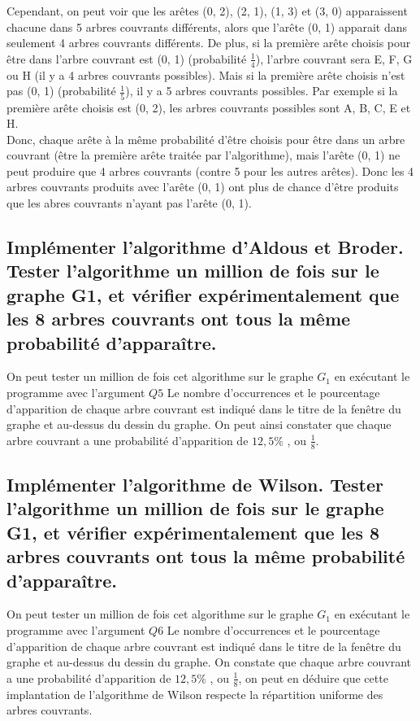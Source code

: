 \documentclass[a4paper,11pt]{article}
\begin{document}
            Cependant, on peut voir que les arêtes (0, 2), (2, 1), (1, 3) et (3, 0) apparaissent chacune dans 5 arbres couvrants différents,
            alors que l'arête (0, 1) apparait dans seulement 4 arbres couvrants différents.
            De plus, si la première arête choisis pour être dans l'arbre couvrant est (0, 1) (probabilité $\frac{1}{4}$),
            l'arbre couvrant sera E, F, G ou H (il y a 4 arbres couvrants possibles).
            Mais si la première arête choisis n'est pas (0, 1) (probabilité $\frac{1}{5}$),
            il y a 5 arbres couvrants possibles.
            Par exemple si la première arête choisis est (0, 2), les arbres couvrants possibles sont A, B, C, E et H.\\

            Donc, chaque arête à la même probabilité d'être choisis pour être dans un arbre couvrant
            (être la première arête traitée par l'algorithme),
            mais l'arête (0, 1) ne peut produire que 4 arbres couvrants (contre 5 pour les autres arêtes).
            Donc les 4 arbres couvrants produits avec l'arête (0, 1) ont plus de chance d'être produits que les abres couvrants n'ayant pas l'arête (0, 1).
    
        \subsection{Implémenter l'algorithme d'Aldous et Broder. Tester l'algorithme un million de fois sur le graphe G1,
        et vérifier expérimentalement que les 8 arbres couvrants ont tous la même probabilité d'apparaître.}\label{subsec:Q5}
            On peut tester un million de fois cet algorithme sur le graphe $G_1$ en exécutant le programme avec l'argument $Q5$
            Le nombre d'occurrences et le pourcentage d'apparition de chaque arbre couvrant est indiqué dans le titre de la fenêtre du graphe et au-dessus du dessin du graphe.
            On peut ainsi constater que chaque arbre couvrant a une probabilité d'apparition de $12,5\%$ , ou $\frac{1}{8}$.

        \subsection{Implémenter l'algorithme de Wilson. Tester l'algorithme un million de fois sur le graphe G1,
        et vérifier expérimentalement que les 8 arbres couvrants ont tous la même probabilité d'apparaître.}\label{subsec:Q6}
            On peut tester un million de fois cet algorithme sur le graphe $G_1$ en exécutant le programme avec l'argument $Q6$
            Le nombre d'occurrences et le pourcentage d'apparition de chaque arbre couvrant est indiqué dans le titre de la fenêtre du graphe et au-dessus du dessin du graphe.
            On constate que chaque arbre couvrant a une probabilité d'apparition de $12,5\%$ , ou $\frac{1}{8}$,
            on peut en déduire que cette implantation de l'algorithme de Wilson respecte la répartition uniforme des arbres couvrants.
\end{document}
